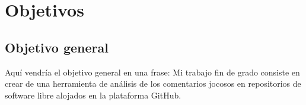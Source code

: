 \documentclass[a4paper, 12pt]{book}
\begin{document}







  
  
  






\cleardoublepage %
\chapter{Objetivos} %
\label{chap:objetivos} %

\section{Objetivo general} %
\label{sec:objetivo-general} %

Aquí vendría el objetivo general en una frase:
Mi trabajo fin de grado consiste en crear de una herramienta de análisis de los comentarios jocosos en repositorios de software libre alojados en la plataforma GitHub.
\end{document}
